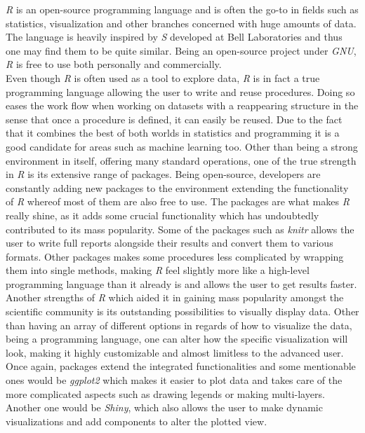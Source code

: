 \documentclass[Report.tex]{subfiles}
\begin{document}
 
\textit{R} is an open-source programming language and is often the go-to in fields such as statistics, visualization and other branches concerned with huge amounts of data. The language is heavily inspired by \textit{S} developed at Bell Laboratories and thus one may find them to be quite similar. Being an open-source project under \textit{GNU}, \textit{R} is free to use both personally and commercially.\\

 Even though \textit{R} is often used as a tool to explore data, \textit{R} is in fact a true programming language allowing the user to write and reuse procedures. Doing so eases the work flow when working on datasets with a reappearing structure in the sense that once a procedure is defined, it can easily be reused. Due to the fact that it combines the best of both worlds in statistics and programming it is a good candidate for areas such as machine learning too. Other than being a strong environment in itself, offering many standard operations, one of the true strength in \textit{R} is its extensive range of packages. Being open-source, developers are constantly adding new packages to the environment extending the functionality of \textit{R} whereof most of them are also free to use. The packages are what makes \textit{R} really shine, as it adds some crucial functionality which has undoubtedly contributed to its mass popularity. Some of the packages such as \textit{knitr} allows the user to write full reports alongside their results and convert them to various formats. Other packages makes some procedures less complicated by wrapping them into single methods, making \textit{R} feel slightly more like a high-level programming language than it already is and allows the user to get results faster. Another strengths of \textit{R} which aided it in gaining mass popularity amongst the scientific community is its outstanding possibilities to visually display data. Other than having an array of different options in regards of how to visualize the data, being a programming language, one can alter how the specific visualization will look, making it highly customizable and almost limitless to the advanced user. Once again, packages extend the integrated functionalities and some mentionable ones would be \textit{ggplot2} which makes it easier to plot data and takes care of the more complicated aspects such as drawing legends or making multi-layers. Another one would be \textit{Shiny}, which also allows the user to make dynamic visualizations and add components to alter the plotted view. \\
 
\end{document}
